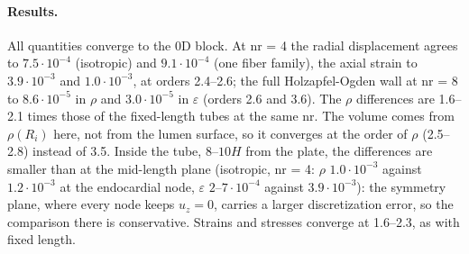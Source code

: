 \paragraph{Results.} All quantities converge to the 0D block. At nr = 4 the radial
displacement agrees to $7.5\cdot10^{-4}$ (isotropic) and $9.1\cdot10^{-4}$ (one fiber
family), the axial strain to $3.9\cdot10^{-3}$ and $1.0\cdot10^{-3}$, at orders 2.4--2.6;
the full Holzapfel-Ogden wall at nr = 8 to $8.6\cdot10^{-5}$ in $\rho$ and $3.0\cdot10^{-5}$ in $\varepsilon$
(orders 2.6 and 3.6). The $\rho$ differences are 1.6--2.1 times those of the fixed-length tubes at the
same nr. The volume comes from $\rho(R_i)$ here, not from the lumen surface, so it
converges at the order of $\rho$ (2.5--2.8) instead of 3.5. Inside the tube, 8--$10H$ from
the plate, the differences are smaller than at the mid-length plane (isotropic, nr = 4:
$\rho$ $1.0\cdot10^{-3}$ against $1.2\cdot10^{-3}$ at the endocardial node, $\varepsilon$
$2$--$7\cdot10^{-4}$ against $3.9\cdot10^{-3}$): the symmetry plane, where every node keeps
$u_z = 0$, carries a larger discretization error, so the comparison there is
conservative. Strains and stresses converge at 1.6--2.3, as with fixed length.
